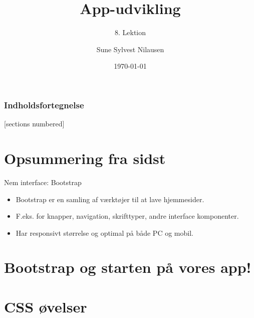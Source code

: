 \documentclass[10pt]{beamer}
\title{App-udvikling}
\subtitle{8. Lektion}
\date{\today}
\author{Sune Sylvest Nilausen}
\begin{document}

\maketitle

\begin{frame}
  \frametitle{Indholdsfortegnelse}
  [sections numbered]
  \tableofcontents[hideallsubsections]
\end{frame}

\section{Opsummering fra sidst}

\begin{frame}{Nem interface: Bootstrap}
	\begin{itemize}
		\item Bootstrap er en samling af værktøjer til at lave hjemmesider.
		\pause
		\item F.eks. for knapper, navigation, skrifttyper, andre interface komponenter.
		\pause
		\item Har responsivt størrelse og optimal på både PC og mobil.
	\end{itemize}
\end{frame}


\section{Bootstrap og starten på vores app!}

\section{CSS øvelser}


 
\end{document}
